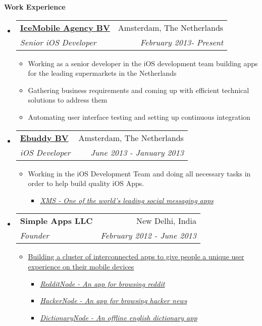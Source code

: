 \documentclass[letterpaper,11pt]{article}
\makeatletter
\newcommand{\resitem}[1]{\item #1 \vspace{-2pt}}
\newcommand{\resheading}[1]{{\large \colorbox{mygrey}{\begin{minipage}{\textwidth}{\textbf{#1 \vphantom{p\^{E}}}}\end{minipage}}}}
\newcommand{\ressubheading}[4]{
\begin{tabular*}{7.0in}{l@{\extracolsep{\fill}}r}
		\textbf{#1} & #2 \\
		\textit{#3} & \textit{#4} \\
\end{tabular*}\vspace{-6pt}}
\makeatother
\begin{document}
\vspace{0.3in}

\resheading{Work Experience}
\begin{itemize}

\item
    \ressubheading{\href{http://www.icemobile.com}{IceMobile Agency BV}}{Amsterdam, The Netherlands}{Senior iOS Developer}{February 2013- Present}
    \begin{itemize}
        \resitem{Working as a senior developer in the iOS development team building apps for the leading supermarkets in the Netherlands}
        \resitem{Gathering business requirements and coming up with efficient technical solutions to address them}
        \resitem{Automating user interface testing and setting up continuous integration}
    \end{itemize}

\item
    \ressubheading{\href{http://www.ebuddy.com}{Ebuddy BV}}{Amsterdam, The Netherlands}{iOS Developer}{June 2013 - January 2013}
    \begin{itemize}
        \resitem{Working in the iOS Development Team and doing all necessary tasks in order to help build quality iOS Apps.}
	\begin{itemize}
             \resitem{\href{https://itunes.apple.com/ca/app/xms-unlimited-messaging.-better./id425154540?mt=8}{\emph{XMS - One of the world's leading social messaging apps}}}
        \end{itemize}
    \end{itemize}

\item
    \ressubheading{Simple Apps LLC}{New Delhi, India}{Founder}{February 2012 - June 2013}
    \begin{itemize}
        \resitem{\href{http://www.nodemesh.net}{Building a cluster of interconnected apps to give people a unique user experience on their mobile devices}}
        \begin{itemize}
           \resitem{\href{https://itunes.apple.com/ca/app/redditnode/id555533903?mt=8}{\emph{RedditNode - An app for browsing reddit}}}
            \resitem{\href{https://itunes.apple.com/ca/app/hackernode/id473882597?mt=8}{\emph{HackerNode - An app for browsing hacker news}}}
            \resitem{\href{https://itunes.apple.com/ca/app/dictionarynode/id538492050?mt=8}{\emph{DictionaryNode - An offline english dictionary app}}}
        \end{itemize}
    \end{itemize}


\end{itemize}
\end{document}
